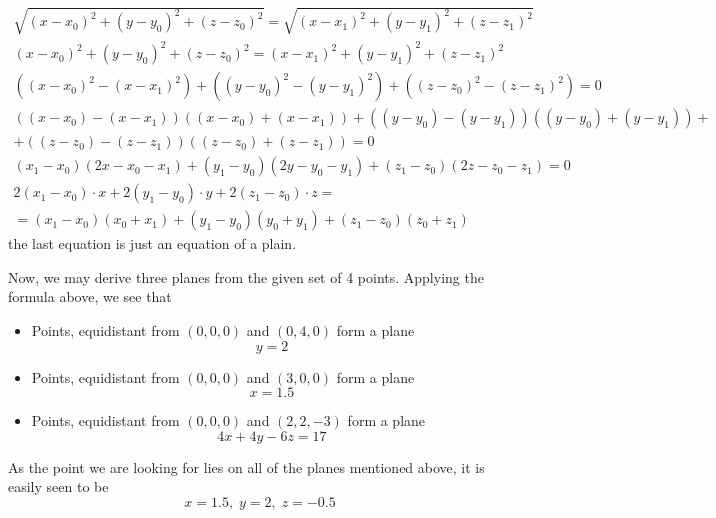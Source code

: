 \documentclass[8pt]{article} %
\begin{document}
\begin{description}
{\begin{gather*}
\sqrt{(x-x_0)^2+(y-y_0)^2+(z-z_0)^2}=
\sqrt{(x-x_1)^2+(y-y_1)^2+(z-z_1)^2}\\
(x-x_0)^2+(y-y_0)^2+(z-z_0)^2=
(x-x_1)^2+(y-y_1)^2+(z-z_1)^2\\
\left((x-x_0)^2-(x-x_1)^2\right)+
\left((y-y_0)^2-(y-y_1)^2\right)+
\left((z-z_0)^2-(z-z_1)^2\right)=0\\
\left((x-x_0)-(x-x_1)\right)\left((x-x_0)+(x-x_1)\right)+
\left((y-y_0)-(y-y_1)\right)\left((y-y_0)+(y-y_1)\right)+\\
+\left((z-z_0)-(z-z_1)\right)\left((z-z_0)+(z-z_1)\right)=0\\
(x_1-x_0)(2x-x_0-x_1)+
(y_1-y_0)(2y-y_0-y_1)+
(z_1-z_0)(2z-z_0-z_1)=0\\
2(x_1-x_0)\cdot x+
2(y_1-y_0)\cdot y+
2(z_1-z_0)\cdot z=\\=
(x_1-x_0)(x_0+x_1)+
(y_1-y_0)(y_0+y_1)+
(z_1-z_0)(z_0+z_1)
\end{gather*}
the last equation is just an equation of a plain.

Now, we may derive three planes from the given set of 4 points. Applying the formula above, we see that 
\begin{itemize}
\item{Points, equidistant from $(0,0,0)$ and $(0,4,0)$ form a plane \[y=2\]}
\item{Points, equidistant from $(0,0,0)$ and $(3,0,0)$ form a plane \[x=1.5\]}
\item{Points, equidistant from $(0,0,0)$ and $(2,2,-3)$ form a plane \[4x+4y-6z=17\]}
\end{itemize}

As the point we are looking for lies on all of the planes mentioned above, it is easily seen to be
\[x=1.5,\;y=2,\;z=-0.5\]
}
\end{description}
\end{document}
